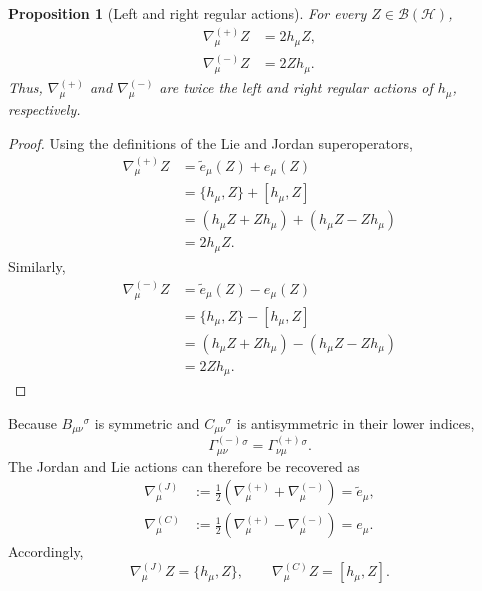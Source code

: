 \documentclass[notitlepage,aip,reprint,onecolumn]{revtex4-1}
\newtheorem{proposition}[theorem]{Proposition}
\theoremstyle{definition}
\begin{document}
\begin{proposition}[Left and right regular actions]
For every \(Z\in\mathcal B(\mathcal H)\),
\begin{subequations}\label{eq:left-right-actions}
\begin{align}
    \nabla^{(+)}_\mu Z
    &=
    2h_\mu Z,
    \label{eq:left-action}
    \\
    \nabla^{(-)}_\mu Z
    &=
    2Zh_\mu.
\label{eq:right-action}
\end{align}
\end{subequations}
Thus, \(\nabla^{(+)}_\mu\) and \(\nabla^{(-)}_\mu\) are twice the left and right regular actions of \(h_\mu\), respectively.
\end{proposition}

\begin{proof}
Using the definitions of the Lie and Jordan superoperators,
\begin{align*}
    \nabla^{(+)}_\mu Z
    &=
    \widetilde e_\mu(Z)+e_\mu(Z)
    \\
    &=
    \{h_\mu,Z\}+[h_\mu,Z]
    \\
    &=
    (h_\mu Z+Zh_\mu)+(h_\mu Z-Zh_\mu)
    \\
    &=
    2h_\mu Z.
\end{align*}
Similarly,
\begin{align*}
    \nabla^{(-)}_\mu Z
    &=
    \widetilde e_\mu(Z)-e_\mu(Z)
    \\
    &=
    \{h_\mu,Z\}-[h_\mu,Z]
    \\
    &=
    (h_\mu Z+Zh_\mu)-(h_\mu Z-Zh_\mu)
    \\
    &=
    2Zh_\mu.
\end{align*}
\end{proof}

Because \(B_{\mu\nu}{}^\sigma\) is symmetric and \(C_{\mu\nu}{}^\sigma\) is antisymmetric in their lower indices,
\[
\Gamma^{(-)}_{\mu\nu}{}^\sigma
=
\Gamma^{(+)}_{\nu\mu}{}^\sigma.
\]
The Jordan and Lie actions can therefore be recovered as
\begin{subequations}
\begin{align}
    \nabla^{(J)}_\mu
    &:=
    \frac12
    \left(
    \nabla^{(+)}_\mu+\nabla^{(-)}_\mu
    \right)
    =
    \widetilde e_\mu,
    \label{eq:nabla-J}
    \\
    \nabla^{(C)}_\mu
    &:=
    \frac12
    \left(
    \nabla^{(+)}_\mu-\nabla^{(-)}_\mu
    \right)
    =
    e_\mu.
    \label{eq:nabla-C}
\end{align}
\end{subequations}
Accordingly,
\[
    \nabla^{(J)}_\mu Z
    =
    \{h_\mu,Z\},
    \qquad
    \nabla^{(C)}_\mu Z
    =
    [h_\mu,Z].
\]
\end{document}
